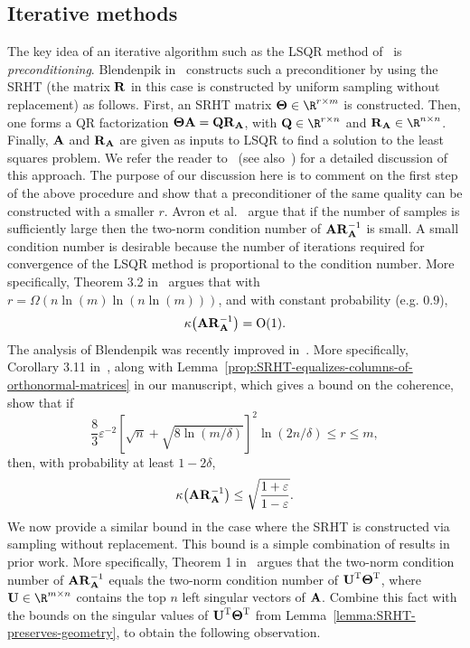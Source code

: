 \subsection{Iterative methods}
The key idea of an iterative algorithm such as the LSQR method of~\cite{PS82} is \emph{preconditioning}.
Blendenpik in~\cite{AMT10} constructs such a preconditioner by using the SRHT
(the matrix ${\bm{\mathrm{R}}}$ in this case is constructed by uniform sampling without replacement) as follows.
First, an SRHT matrix $\matTh \in \R^{r \times m}$ is constructed. Then, one forms a QR factorization
${\bm{\mathrm{\Theta}}} {\bm{\mathrm{A}}} = {\bm{\mathrm{Q}}} {\bm{\mathrm{R}}}_{{\bm{\mathrm{A}}}}$, with $\matQ \in \R^{r \times n}$ and $\matR_{\matA} \in \R^{n \times n}$. Finally,
${\bm{\mathrm{A}}}$ and  ${\bm{\mathrm{R}}}_{{\bm{\mathrm{A}}}}$ are given as inputs to LSQR to find a solution to the least squares
problem. We refer the reader to~\cite{AMT10} (see also~\cite{IW12}) for a detailed discussion  of this approach. The purpose of our discussion
here is to comment on the first step of the above procedure and
show that a preconditioner of the same quality can be constructed with a smaller $r$.
Avron et al.~\cite{AMT10} argue that if the number of samples is sufficiently large
then the two-norm condition number of ${\bm{\mathrm{A}}} {\bm{\mathrm{R}}}_{{\bm{\mathrm{A}}}}^{-1}$ is small. A small condition number is desirable because
the number of iterations required for convergence of the LSQR method  is proportional to the condition number.
More specifically, Theorem 3.2 in~\cite{AMT10} argues that with  $r = \Omega\left( n \ln(m) \ln(n \ln(m))\right)$, and with constant probability (e.g. $0.9$),
$$ \kappa{ \left( {\ensuremath{\bm{\mathrm{A}}}}{\ensuremath{\bm{\mathrm{R}}}}_{{\ensuremath{\bm{\mathrm{A}}}}}^{-1} \right) } = \mathrm{O}( 1).$$
The analysis of Blendenpik was recently improved in~\cite{IW12}.
More specifically,  Corollary 3.11 in~\cite{IW12}, along with Lemma~\ref{prop:SRHT-equalizes-columns-of-orthonormal-matrices} in our manuscript,
which gives a bound on the coherence,  show that if
\[
 \frac{8}{3} \varepsilon^{-2} \left[\sqrt{n} + \sqrt{8\ln(m/\delta)} \right]^2 \ln(2n/\delta) \leq r \leq m,
\]
then, with probability at least $1 -  2 \delta$,
$$\kappa{ \left( {\ensuremath{\bm{\mathrm{A}}}}{\ensuremath{\bm{\mathrm{R}}}}_{{\ensuremath{\bm{\mathrm{A}}}}}^{-1} \right) } \le \sqrt{ {1 +\varepsilon\over 1 - \varepsilon}}.$$
 We now provide a similar bound in the case where the SRHT is constructed via sampling without replacement.
This bound is a simple combination of results in prior work.
More specifically, Theorem 1 in~\cite{RT08} argues that the two-norm condition number of ${\bm{\mathrm{A}}} {\bm{\mathrm{R}}}_{{\bm{\mathrm{A}}}}^{-1}$ equals the two-norm condition number
of ${\bm{\mathrm{U}}}^{\textsc{T}} {\bm{\mathrm{\Theta}}}^{\textsc{T}}$, where $\matU \in \R^{m \times n}$ contains the top $n$ left singular vectors of ${\bm{\mathrm{A}}}$.
Combine this fact with the bounds on the singular values of ${\bm{\mathrm{U}}}^{\textsc{T}} {\bm{\mathrm{\Theta}}}^{\textsc{T}}$ from Lemma~\ref{lemma:SRHT-preserves-geometry},
to obtain the following observation.

